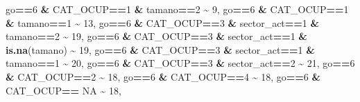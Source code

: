 \documentclass[
]{article}
\newenvironment{Shaded}{\begin{snugshade}}{\end{snugshade}}
\newcommand{\ConstantTok}[1]{\textcolor[rgb]{0.56,0.35,0.01}{#1}}
\newcommand{\DecValTok}[1]{\textcolor[rgb]{0.00,0.00,0.81}{#1}}
\newcommand{\FunctionTok}[1]{\textcolor[rgb]{0.13,0.29,0.53}{\textbf{#1}}}
\newcommand{\NormalTok}[1]{#1}
\newcommand{\SpecialCharTok}[1]{\textcolor[rgb]{0.81,0.36,0.00}{\textbf{#1}}}
\begin{document}
\begin{Shaded}
\begin{Highlighting}[]
\NormalTok{                               go}\SpecialCharTok{==}\DecValTok{6} \SpecialCharTok{\&}\NormalTok{ CAT\_OCUP}\SpecialCharTok{==}\DecValTok{1} \SpecialCharTok{\&}\NormalTok{ tamano}\SpecialCharTok{==}\DecValTok{2}  \SpecialCharTok{\textasciitilde{}} \DecValTok{9}\NormalTok{,}
\NormalTok{                               go}\SpecialCharTok{==}\DecValTok{6} \SpecialCharTok{\&}\NormalTok{ CAT\_OCUP}\SpecialCharTok{==}\DecValTok{1} \SpecialCharTok{\&}\NormalTok{ tamano}\SpecialCharTok{==}\DecValTok{1}  \SpecialCharTok{\textasciitilde{}} \DecValTok{13}\NormalTok{,}
\NormalTok{                               go}\SpecialCharTok{==}\DecValTok{6} \SpecialCharTok{\&}\NormalTok{ CAT\_OCUP}\SpecialCharTok{==}\DecValTok{3} \SpecialCharTok{\&}\NormalTok{ sector\_act}\SpecialCharTok{==}\DecValTok{1} \SpecialCharTok{\&}\NormalTok{ tamano}\SpecialCharTok{==}\DecValTok{2} \SpecialCharTok{\textasciitilde{}} \DecValTok{19}\NormalTok{,}
\NormalTok{                               go}\SpecialCharTok{==}\DecValTok{6} \SpecialCharTok{\&}\NormalTok{ CAT\_OCUP}\SpecialCharTok{==}\DecValTok{3} \SpecialCharTok{\&}\NormalTok{ sector\_act}\SpecialCharTok{==}\DecValTok{1} \SpecialCharTok{\&} \FunctionTok{is.na}\NormalTok{(tamano)  }\SpecialCharTok{\textasciitilde{}} \DecValTok{19}\NormalTok{,}
\NormalTok{                               go}\SpecialCharTok{==}\DecValTok{6} \SpecialCharTok{\&}\NormalTok{ CAT\_OCUP}\SpecialCharTok{==}\DecValTok{3} \SpecialCharTok{\&}\NormalTok{ sector\_act}\SpecialCharTok{==}\DecValTok{1} \SpecialCharTok{\&}\NormalTok{ tamano}\SpecialCharTok{==}\DecValTok{1} \SpecialCharTok{\textasciitilde{}} \DecValTok{20}\NormalTok{,}
\NormalTok{                               go}\SpecialCharTok{==}\DecValTok{6} \SpecialCharTok{\&}\NormalTok{ CAT\_OCUP}\SpecialCharTok{==}\DecValTok{3} \SpecialCharTok{\&}\NormalTok{ sector\_act}\SpecialCharTok{==}\DecValTok{2} \SpecialCharTok{\textasciitilde{}} \DecValTok{21}\NormalTok{,}
\NormalTok{                               go}\SpecialCharTok{==}\DecValTok{6} \SpecialCharTok{\&}\NormalTok{ CAT\_OCUP}\SpecialCharTok{==}\DecValTok{2}  \SpecialCharTok{\textasciitilde{}} \DecValTok{18}\NormalTok{,}
\NormalTok{                               go}\SpecialCharTok{==}\DecValTok{6} \SpecialCharTok{\&}\NormalTok{ CAT\_OCUP}\SpecialCharTok{==}\DecValTok{4}  \SpecialCharTok{\textasciitilde{}} \DecValTok{18}\NormalTok{,}
\NormalTok{                               go}\SpecialCharTok{==}\DecValTok{6} \SpecialCharTok{\&}\NormalTok{ CAT\_OCUP}\SpecialCharTok{==} \ConstantTok{NA}    \SpecialCharTok{\textasciitilde{}} \DecValTok{18}\NormalTok{,}
         

\end{Highlighting}
\end{Shaded}
\end{document}
